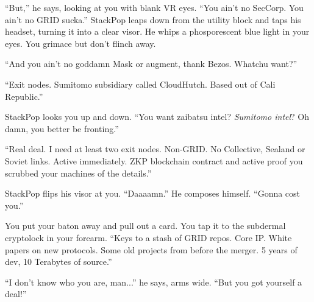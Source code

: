 \documentclass[ebook,11pt,oneside,openany]{memoir}
\begin{document}
``But,'' he says, looking at you with blank VR eyes. ``You ain't no SecCorp. You ain't no GRID sucka.'' StackPop leaps down from the utility block and taps his headset, turning it into a clear visor. He whips a phosporescent blue light in your eyes. You grimace but don't flinch away.

``And you ain't no goddamn Mask or augment, thank Bezos. Whatchu want?''

``Exit nodes. Sumitomo subsidiary called CloudHutch. Based out of Cali Republic.''

StackPop looks you up and down. ``You want zaibatsu intel? \textit{Sumitomo intel}? Oh damn, you better be fronting.''

``Real deal. I need at least two exit nodes. Non-GRID. No Collective, Sealand or Soviet links. Active immediately. ZKP blockchain contract and active proof you scrubbed your machines of the details.''

StackPop flips his visor at you. ``Daaaamn.'' He composes himself. ``Gonna cost you.''

You put your baton away and pull out a card. You tap it to the subdermal cryptolock in your forearm. ``Keys to a stash of GRID repos. Core IP. White papers on new protocols. Some old projects from before the merger. 5 years of dev, 10 Terabytes of source.''

``I don't know who you are, man...'' he says, arms wide. ``But you got yourself a deal!''
\end{document}
